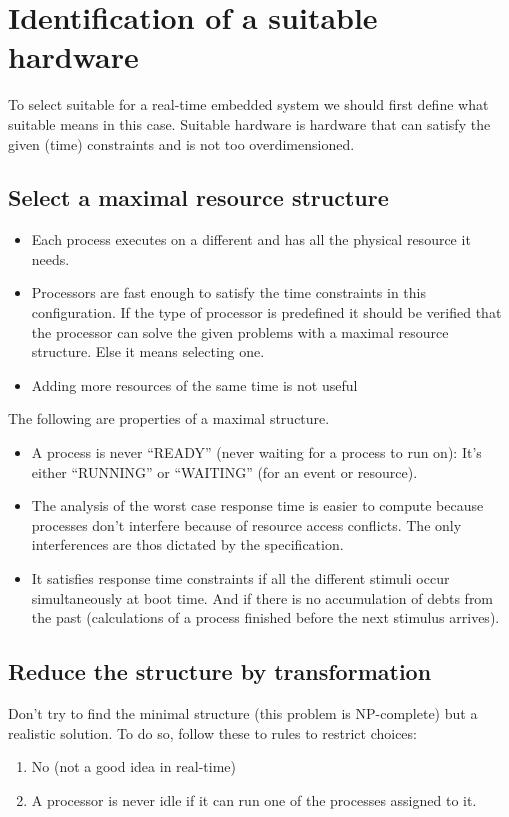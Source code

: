 \documentclass[../main.tex]{subfiles}
\begin{document}
\chapter{Identification of a suitable hardware}
To select suitable  for a real-time embedded system we should first define what suitable means in this case. Suitable hardware is hardware that can satisfy the given (time) constraints and is not too overdimensioned.

\section{Select a maximal resource structure}

\begin{itemize}
	\item Each process executes on a different  and has all the physical resource it needs.
	\item Processors are fast enough to satisfy the time constraints in this configuration. If the type of processor is predefined it should be verified that the processor can solve the given problems with a maximal resource structure. Else it means selecting one.
	\item Adding more resources of the same time is not useful
\end{itemize}

The following are properties of a maximal  structure.
\begin{itemize}
	\item A process is never ``READY'' (never waiting for a process to run on): It's either ``RUNNING'' or ``WAITING'' (for an event or resource).
	\item The analysis of the worst case response time is easier to compute because processes don't interfere because of resource access conflicts. The only interferences are thos dictated by the specification.
	\item It satisfies response time constraints if all the different stimuli occur simultaneously at boot time. And if there is no accumulation of debts from the past (calculations of a process finished before the next stimulus arrives).
\end{itemize}

\section{Reduce the structure by transformation}
Don't try to find the minimal structure (this problem is NP-complete) but a realistic solution. To do so, follow these to rules to restrict choices:
\begin{enumerate}
	\item No  (not a good idea in real-time)
	\item A processor is never idle if it can run one of the processes assigned to it.
\end{enumerate}
\end{document}
